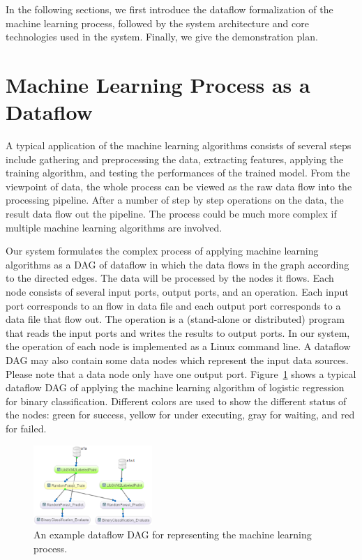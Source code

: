 \documentclass{sig-alternate-05-2015}
\begin{document}
In the following sections, we first introduce the dataflow formalization of the machine learning process, followed by the system architecture and core technologies used in the system. Finally, we give the demonstration plan.

\section{Machine Learning Process as a Dataflow}
A typical application of the machine learning algorithms consists of several steps include gathering and preprocessing the data, extracting features, applying the training algorithm, and testing the performances of the trained model. From the viewpoint of data, the whole process can be viewed as the raw data flow into the processing pipeline. After a number of step by step operations on the data, the result data flow out the pipeline. The process could be much more complex if multiple machine learning algorithms are involved.

Our system formulates the complex process of applying machine learning algorithms as a DAG of dataflow in which the data flows in the graph according to the directed edges. The data will be processed by the nodes it flows. Each node consists of several input ports, output ports, and an operation. Each input port corresponds to an flow in data file and each output port corresponds to a data file that flow out. The operation is a (stand-alone or distributed) program that reads the input ports and writes the results to output ports. In our system, the operation of each node is implemented as a Linux command line. A dataflow DAG may also contain some data nodes which represent the input data sources. Please note that a data node only have one output port. Figure~\ref{fig:dag} shows a typical dataflow DAG of applying the machine learning algorithm of logistic regression for binary classification. Different colors are used to show the different status of the nodes: green for success, yellow for under executing, gray for waiting, and red for failed.
\begin{figure}
\centering
\includegraphics[width = 0.4\textwidth]{dataflow_DAG.eps}
\caption{An example dataflow DAG for representing the machine learning process.}
\label{fig:dag}
\end{figure}
\end{document}
